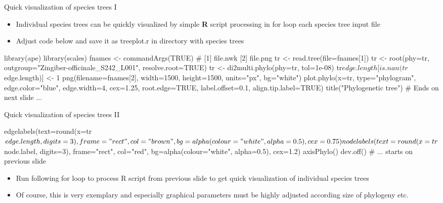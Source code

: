 \documentclass[compress,  xelatex, 11pt, xcolor=x11names, aspectratio=169,
	hyperref={
		bookmarks=true,
		unicode=true,
		colorlinks=true,
		pdftitle={HybSeq course},
		plainpages=false,
		pdfauthor={Vojtech Zeisek},
		pdfsubject={Practical processing of HybSeq target enrichment sequencing data on computing grids like MetaCentrum},
		pdfcreator={XeLaTeX},
		pdfkeywords={BASH, command line, GNU, HybSeq, Linux, MetaCentrum, sequencing shell, target enrichment},
		linkcolor=Turquoise4, %
		anchorcolor=DodgerBlue4, %
		citecolor=DodgerBlue4, %
		filecolor=DodgerBlue4, %
		menucolor=Tan4, %
		urlcolor=DarkOliveGreen4 %
		},
	url={hyphens, lowtilde} %
	]{beamer}
\renewcommand{\texttt}[1]{\colorbox{Cornsilk2}{{\ttfamily #1}}}
\begin{document}
\begin{frame}[fragile]{Quick visualization of species trees I}
	\begin{itemize}
		\item Individual species trees can be quickly visualized by simple \textbf{R} script processing in \texttt{for} loop each species tree input file
		\item Adjust code below and save it as \texttt{treeplot.r} in directory  with species trees
	\end{itemize}
	\begin{spluscode}
    library(ape)
    library(scales)
    fnames <- commandArgs(TRUE) # [1] file.nwk [2] file.png
    tr <- read.tree(file=fnames[1])
    tr <- root(phy=tr, outgroup="Zingiber-officinale_S242_L001",
      resolve.root=TRUE)
    tr <- di2multi.phylo(phy=tr, tol=1e-08)
    tr$edge.length[is.nan(tr$edge.length)] <- 1
    png(filename=fnames[2], width=1500, height=1500, units="px", bg="white")
      plot.phylo(x=tr, type="phylogram", edge.color="blue", edge.width=4,
        cex=1.25, root.edge=TRUE, label.offset=0.1, align.tip.label=TRUE)
      title("Phylogenetic tree") # Ends on next slide ...
	\end{spluscode}
\end{frame}

\begin{frame}[fragile]{Quick visualization of species trees II}
	\begin{spluscode}
      edgelabels(text=round(x=tr$edge.length, digits=3), frame="rect",
        col="brown", bg=alpha(colour="white", alpha=0.5), cex=0.75)
      nodelabels(text=round(x=tr$node.label, digits=3), frame="rect",
        col="red", bg=alpha(colour="white", alpha=0.5), cex=1.2)
      axisPhylo()
      dev.off() # ... starts on previous slide
	\end{spluscode}
	\begin{itemize}
		\item Run following \texttt{for} loop to process \texttt{R} script from previous slide to get quick visualization of individual species trees
		\item Of course, this is very exemplary and especially graphical parameters must be highly adjusted according size of phylogeny etc.
	\end{itemize}
\end{frame}
\end{document}
